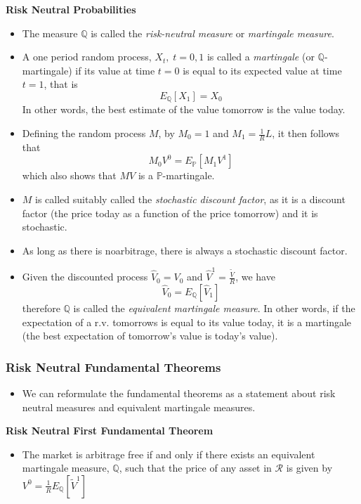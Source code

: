 \documentclass[11pt]{article}
\begin{document}
\textbf{Risk Neutral Probabilities}
\begin{itemize}
    \item The measure $\mathbb{Q}$ is called the \textit{risk-neutral measure} or 
    \textit{martingale measure}.
    \item A one period random process, $X_t, \; t=0,1$ is called a \textit{martingale} (or 
    $\mathbb{Q}$-martingale) if its value at time $t=0$ is equal to its expected value at time 
    $t=1$, that is
    \[E_{\mathbb{Q}}[X_1] = X_0\]
    In other words, the best estimate of the value tomorrow is the value today.
    \item Defining the random process $M$, by $M_0=1$ and $M_1=\frac{1}{R}L$, it then follows 
    that 
    \[M_0 V^0 = E_{\mathbb{P}}[M_1 V^1]\]
    which also shows that $MV$ is a $\mathbb{P}$-martingale.
    \item $M$ is called suitably called the \textit{stochastic discount factor}, as it is a 
    discount factor (the price today as a function of the price tomorrow) and it is stochastic.
    \item As long as there is noarbitrage, there is always a stochastic discount factor. 
    \item Given the discounted process $\hat{V}_0 = V_0$ and $\hat{V}^1 = \frac{\tilde{V}}{R}$,
    we have 
    \[\hat{V}_0 = E_{\mathbb{Q}}[\hat{V}_1]\]
    therefore $\mathbb{Q}$ is called the \textit{equivalent martingale measure}. In other 
    words, if the expectation of a r.v. tomorrows is equal to its value today, it is a 
    martingale (the best expectation of tomorrow's value is today's value).
\end{itemize}


\subsubsection{Risk Neutral Fundamental Theorems}
\begin{itemize}
    \item We can reformulate the fundamental theorems as a statement about risk neutral
    measures and equivalent martingale measures.
\end{itemize}

\textbf{Risk Neutral First Fundamental Theorem}
\begin{itemize}
    \item The market is arbitrage free if and only if there exists an equivalent martingale 
    measure, $\mathbb{Q}$, such that the price of any asset in $\mathcal{R}$ is given by 
    $V^0 = \frac{1}{R}E_{\mathbb{Q}}[\tilde{V}^1]$
\end{itemize}
\end{document}
